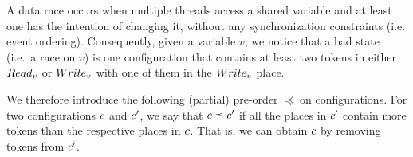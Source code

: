 \label{section:races}


\noindent%
\begin{minipage}{0.6\linewidth}
  A data race occurs when multiple threads access a shared variable
  and at least one has the intention of changing it, without any
  synchronization constraints (i.e. event ordering). Consequently,
  given a variable $v$, we notice that a bad state (i.e.\ a race on
  $v$) is one configuration that contains at least two tokens in
  either $Read_{v}$ or $Write_{v}$ with one of them in the $Write_{v}$ place.
\end{minipage}
\begin{minipage}{0.39\linewidth}
  \hfill%
\end{minipage}

We therefore introduce the following (partial) pre-order $\preceq$ on
configurations.  For two configurations $c$ and $c'$, we say
that $c\preceq c'$ if all the places in $c'$ contain more
tokens than the respective places in $c$. That is, we can obtain
$c$ by removing tokens from $c'$.

